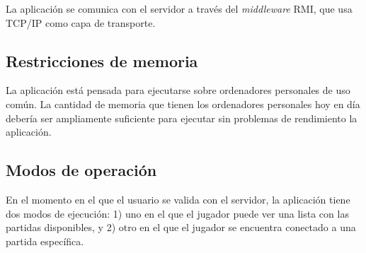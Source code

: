 La aplicación se comunica con el servidor a través del \textit{middleware} RMI,
que usa TCP/IP como capa de transporte.

\subsection{Restricciones de memoria}

La aplicación está pensada para ejecutarse sobre ordenadores personales de uso
común. La cantidad de memoria que tienen los ordenadores personales hoy en día
debería ser ampliamente suficiente para ejecutar sin problemas de rendimiento
la aplicación.

\subsection{Modos de operación}

En el momento en el que el usuario se valida con el servidor, la aplicación
tiene dos modos de ejecución: 1) uno en el que el jugador puede ver una lista
con las partidas disponibles, y 2) otro en el que el jugador se encuentra
conectado a una partida específica.
